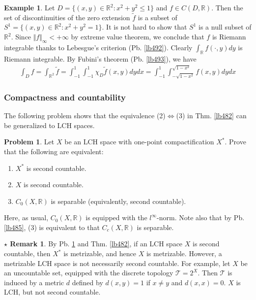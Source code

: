 \documentclass[12pt,b5paper,notitlepage]{article}
\theoremstyle{definition}
\newtheorem{eg}[df]{Example}
\newtheorem{srem}[df]{$\star$ Remark}
\newtheorem{prob}{\color{red}Problem}[section]
\theoremstyle{plain}
\newcommand{\mc}{\mathcal}
\newcommand{\wtd}{\widetilde}
\newcommand{\Rbb}{\mathbb R}
\numberwithin{equation}{section}
\begin{document}
\begin{eg}
Let $D=\{(x,y)\in\Rbb^2:x^2+y^2\leq1\}$ and $f\in C(D,\Rbb)$. Then the set of discontinuities of the zero extension $\wtd f$ is a subset of $S^1=\{(x,y)\in\Rbb^2:x^2+y^2=1\}$. It is not hard to show that $S^1$ is a null subset of $\Rbb^2$. Since $\Vert f\Vert_\infty<+\infty$ by extreme value theorem, we conclude that $f$ is Riemann integrable thanks to Lebesgue's criterion (Pb. \ref{lb492}). Clearly $\int_\Rbb f(\cdot,y)dy$ is Riemann integrable. By Fubini's theorem (Pb. \ref{lb493}), we have
\begin{align*}
\int_D f=\int_{\Rbb^2}\wtd f=\int_{-1}^1\int_{-1}^1 \chi_D\wtd f(x,y)dydx=\int_{-1}^1\int_{-\sqrt{1-x^2}}^{\sqrt{1-x^2}}f(x,y)dydx
\end{align*}
\end{eg}








\subsubsection{Compactness and countability}


The following problem shows that the equivalence (2)$\Leftrightarrow$(3) in Thm. \ref{lb482} can be generalized to LCH spaces.

\begin{prob}\label{lb484}
Let $X$ be an LCH space with one-point compactification $X^*$. Prove that the following are equivalent:
\begin{enumerate}[label=(\arabic*)]
\item $X^*$ is second countable.
\item $X$ is second countable.
\item $C_0(X,\Rbb)$ is separable (equivalently, second countable).
\end{enumerate}
Here, as usual, $C_0(X,\Rbb)$ is equipped with the $l^\infty$-norm. Note also that by Pb. \ref{lb485}, (3) is equivalent to that $C_c(X,\Rbb)$ is separable.
\end{prob}


\begin{srem}
By Pb. \ref{lb484} and Thm. \ref{lb482}, if an LCH space $X$ is second countable, then $X^*$ is metrizable, and hence $X$ is metrizable. However, a metrizable LCH space is not necessarily second countable. For example, let $X$ be an uncountable set, equipped with the discrete topology $\mc T=2^X$. Then $\mc T$ is induced by a metric $d$ defined by $d(x,y)=1$ if $x\neq y$ and $d(x,x)=0$. $X$ is LCH, but not second countable.
\end{srem}
\end{document}
